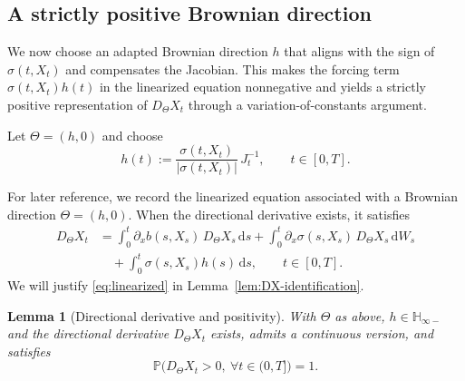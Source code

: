 \documentclass[11pt]{article}
\newcommand{\Pbb}{\mathbb{P}}
\newcommand{\Hb}{\mathbb{H}}
\newcommand{\1}{\mathbf{1}}
\newcommand{\dd}{\mathrm{d}}
\theoremstyle{plain}
\newtheorem{lemma}[theorem]{Lemma}
\theoremstyle{definition}
\theoremstyle{remark}
\begin{document}
\subsection{A strictly positive Brownian direction}

We now choose an adapted Brownian direction $h$ that aligns with the sign of $\sigma(t,X_t)$ and compensates the Jacobian.
This makes the forcing term $\sigma(t,X_t)h(t)$ in the linearized equation nonnegative and yields a strictly positive representation
of $D_\Theta X_t$ through a variation-of-constants argument.

Let $\Theta=(h,0)$ and choose
\begin{equation}\label{eq:hchoice}
h(t):=\frac{\sigma(t,X_t)}{|\sigma(t,X_t)|}\,J_t^{-1},\qquad t\in[0,T].
\end{equation}

\medskip
For later reference, we record the linearized equation associated with a Brownian direction $\Theta=(h,0)$.
When the directional derivative exists, it satisfies
\begin{equation}\label{eq:linearized}
\begin{aligned}
D_\Theta X_t
&=\int_0^t \partial_x b(s,X_s)\,D_\Theta X_s\,\dd s
+\int_0^t \partial_x\sigma(s,X_s)\,D_\Theta X_s\,\dd W_s\\
&\quad+\int_0^t \sigma(s,X_s)h(s)\,\dd s,\qquad t\in[0,T].
\end{aligned}
\end{equation}
We will justify \eqref{eq:linearized} in Lemma~\ref{lem:DX-identification}.

\begin{lemma}[Directional derivative and positivity]\label{lem:DXpos}
With $\Theta$ as above, $h\in \Hb_{\infty-}$ and the directional derivative $D_\Theta X_t$ exists, admits
a continuous version, and satisfies
\[
\Pbb\big(D_\Theta X_t>0,\ \forall t\in(0,T]\big)=1.
\]
\end{lemma}
\end{document}
